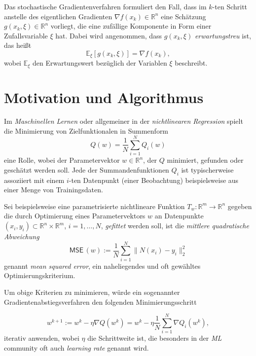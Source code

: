 \documentclass[
]{book}
\theoremstyle{definition}
\theoremstyle{definition}
\theoremstyle{definition}
\theoremstyle{definition}
\theoremstyle{remark}
\begin{document}
Das stochastische Gradientenverfahren formuliert den Fall, dass im \(k\)-ten Schritt anstelle des eigentlichen Gradienten \(\nabla f(x_k)\in \mathbb R^{n}\) eine Schätzung \(g(x_k, \xi)\in \mathbb R^{n}\) vorliegt, die eine zufällige Komponente in Form einer Zufallsvariable \(\xi\) hat. Dabei wird angenommen, dass \(g(x_k, \xi)\) \emph{erwartungstreu} ist, das heißt
\begin{equation*}
\mathbb E_\xi [g(x_k, \xi)] = \nabla f(x_k),
\end{equation*}
wobei \(\mathbb E_\xi\) den Erwartungswert bezüglich der Variablen \(\xi\) beschreibt.

\hypertarget{motivation-und-algorithmus}{%
\section{Motivation und Algorithmus}\label{motivation-und-algorithmus}}

Im \emph{Maschinellen Lernen} oder allgemeiner in der \emph{nichtlinearen Regression} spielt die Minimierung von Zielfunktionalen in Summenform
\begin{equation*}
Q(w) = \frac{1}{N}\sum_{i=1}^N Q_i(w)
\end{equation*}
eine Rolle, wobei der Parametervektor \(w\in \mathbb R^n\), der
\(Q\) minimiert, gefunden oder geschätzt werden soll.
Jede der Summandenfunktionen \(Q_i\) ist typischerweise assoziiert mit einem \(i\)-ten Datenpunkt (einer Beobachtung) beispielsweise aus einer Menge von Trainingsdaten.

Sei beispielsweise eine parametrisierte nichtlineare Funktion \(T_w\colon \mathbb R^{m}\to \mathbb R^{n}\) gegeben die durch Optimierung eines Parametervektors \(w\) an Datenpunkte \((x_i, y_i)\subset \mathbb R^{n}\times \mathbb R^{m}\), \(i=1, \dotsc, N\), \emph{gefittet} werden soll, ist die \emph{mittlere quadratische Abweichung}
\begin{equation*}
\mathsf{MSE}\,(w) := \frac 1N \sum_{i=1}^N \|N(x_i)-y_i\|_2^2
\end{equation*}
genannt \emph{mean squared error}, ein naheliegendes und oft gewähltes Optimierungskriterium.

Um obige Kriterien zu minimieren, würde ein sogenannter Gradientenabstiegsverfahren den folgenden Minimierungsschritt

\begin{equation*}
w^{k+1} := w^{k} - \eta \nabla Q(w^k) = w^k - \eta \frac{1}{N} \sum_{i=1}^N \nabla Q_i(w^k),
\end{equation*}
iterativ anwenden, wobei \(\eta\) die Schrittweite ist, die besonders in der \emph{ML} community oft auch \emph{learning rate} genannt wird.
\end{document}
